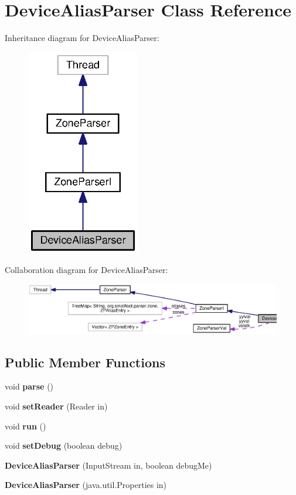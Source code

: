 \section{Device\+Alias\+Parser Class Reference}
\label{classorg_1_1smallfoot_1_1parser_1_1zone_1_1DeviceAliasParser}


Inheritance diagram for Device\+Alias\+Parser\+:\nopagebreak
\begin{figure}[H]
\begin{center}
\leavevmode
\includegraphics[width=140pt]{classorg_1_1smallfoot_1_1parser_1_1zone_1_1DeviceAliasParser__inherit__graph}
\end{center}
\end{figure}


Collaboration diagram for Device\+Alias\+Parser\+:\nopagebreak
\begin{figure}[H]
\begin{center}
\leavevmode
\includegraphics[width=350pt]{classorg_1_1smallfoot_1_1parser_1_1zone_1_1DeviceAliasParser__coll__graph}
\end{center}
\end{figure}
\subsection*{Public Member Functions}
\begin{DoxyCompactItemize}
\item 
void {\bf parse} ()
\item 
void {\bf set\+Reader} (Reader in)
\item 
void {\bf run} ()
\item 
void {\bf set\+Debug} (boolean debug)
\item 
{\bf Device\+Alias\+Parser} (Input\+Stream in, boolean debug\+Me)
\item 
{\bf Device\+Alias\+Parser} (java.\+util.\+Properties in)
\end{DoxyCompactItemize}
